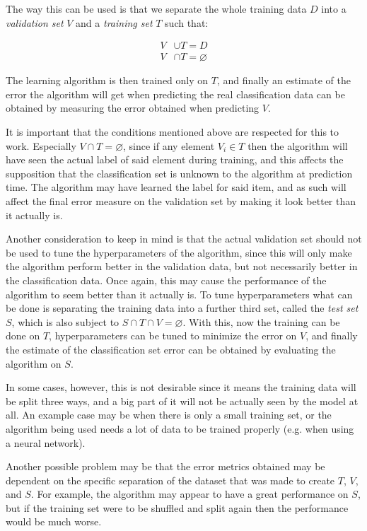 \documentclass[epsfig,a4paper,11pt,titlepage,twoside,openany]{book}
\begin{document}
The way this can be used is that we separate the whole training data $D$ into a \textit{validation set} $V$ and a \textit{training set} $T$ such that:

\begin{align*}
    V &\cup T = D \\ 
    V &\cap T = \varnothing
\end{align*}

The learning algorithm is then trained only on $T$, and finally an estimate of the error the algorithm will get when predicting the real classification data can be obtained by measuring the error obtained when predicting $V$. 

It is important that the conditions mentioned above are respected for this to work. Especially $V \cap T = \varnothing$, since if any element $V_i \in T$ then the algorithm will have seen the actual label of said element during training, and this affects the supposition that the classification set is unknown to the algorithm at prediction time. The algorithm may have learned the label for said item, and as such will affect the final error measure on the validation set by making it look better than it actually is.

Another consideration to keep in mind is that the actual validation set should not be used to tune the hyperparameters of the algorithm, since this will only make the algorithm perform better in the validation data, but not necessarily better in the classification data. Once again, this may cause the performance of the algorithm to seem better than it actually is. To tune hyperparameters what can be done is separating the training data into a further third set, called the \textit{test set} $S$, which is also subject to $S \cap T \cap V = \varnothing$. With this, now the training can be done on $T$, hyperparameters can be tuned to minimize the error on $V$, and finally the estimate of the classification set error can be obtained by evaluating the algorithm on $S$.

In some cases, however, this is not desirable since it means the training data will be split three ways, and a big part of it will not be actually seen by the model at all. An example case may be when there is only a small training set, or the algorithm being used needs a lot of data to be trained properly (e.g. when using a neural network).

Another possible problem may be that the error metrics obtained may be dependent on the specific separation of the dataset that was made to create $T$, $V$, and $S$. For example, the algorithm may appear to have a great performance on $S$, but if the training set were to be shuffled and split again then the performance would be much worse.
\end{document}
